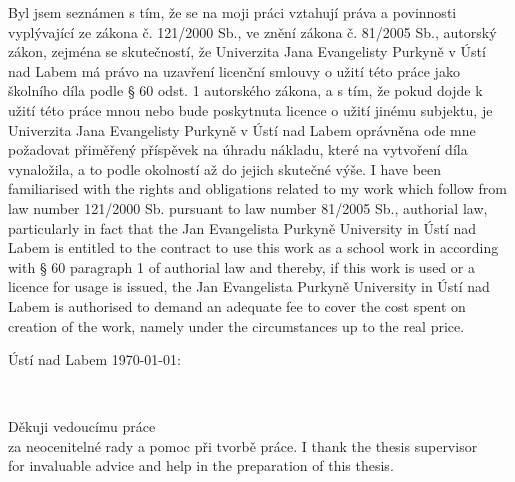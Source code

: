 \documentclass[male,czech,api_bc]{kitheses}
\newcommand{\ZT}[1]{\colorbox{yellow}{\color{red}{#1}}}
\newcommand{\nazevcz}{\ZT{Závěrečná práce na KI PřF UJEP}}        %
\newcommand{\vedouciDAT}{\ZT{RNDr. Jiřímu Škvorovi, Ph.D.}}
\begin{document}
\vspace{0.5em}

{
Byl jsem seznámen 
s tím, že se na moji práci vztahují práva a povinnosti vyplývající ze
zákona č. 121/2000 Sb., ve znění zákona č. 81/2005 Sb., autorský zákon, zejména se
skutečností, že Univerzita Jana Evangelisty Purkyně v Ústí nad Labem má právo na uzavření
licenční smlouvy o užití této práce jako školního díla podle § 60 odst. 1 autorského zákona, a
s tím, že pokud dojde k užití této práce mnou nebo bude poskytnuta licence o užití jinému
subjektu, je Univerzita Jana Evangelisty Purkyně v Ústí nad Labem oprávněna ode mne
požadovat přiměřený příspěvek na úhradu nákladu, které na vytvoření díla vynaložila, a to
podle okolností až do jejich skutečné výše.
}{
I have been familiarised with the rights and obligations related to my work which follow from law
number 121/2000 Sb. pursuant to law number 81/2005 Sb., authorial law, particularly in fact that
the Jan Evangelista Purkyně University in Ústí nad Labem is entitled to the contract to use this
work as a school work in according with § 60 paragraph 1 of authorial law and thereby, if this
work is used or a licence for usage is issued, the Jan Evangelista Purkyně University in Ústí
nad Labem is authorised to demand an adequate fee to cover the cost spent on creation of the
work, namely under the circumstances up to the real price.
}
\vspace{2em}

 Ústí nad Labem \today   \hfill {}: \makebox[4cm][s]{\dotfill}

\cleardoublepage
\thispagestyle{empty}
~
\vfill

\begin{flushright}
    {
        Děkuji vedoucímu práce \ZT{\vedouciDAT}\\ 
        za neocenitelné rady a pomoc při tvorbě  práce.
    }{
        I thank the thesis supervisor \ZT{\vedouciDAT}\\ 
        for invaluable advice and help in the preparation of this  thesis.
    }
\end{flushright}

\cleardoublepage

\textsc{\nazevcz}
\end{document}
